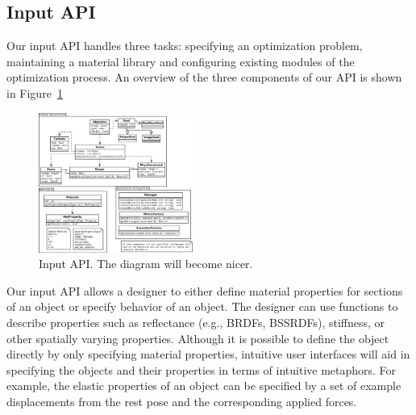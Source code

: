 \documentclass[annual]{acmsiggraph}
\begin{document}
\subsection{Input API}
Our input API handles three tasks: specifying an optimization problem,
maintaining a material library and configuring existing modules of
the optimization process.
An overview of the three components of our API is shown in Figure~\ref{fig:inputAPI}

\begin{figure}
\includegraphics[width=0.45\textwidth]{figure/inputAPI.pdf}
\caption{Input API. The diagram will become nicer.}
\label{fig:inputAPI}
\end{figure}

Our input API allows a designer to either
define material properties for sections of an object
or specify behavior of an object.
The designer
can use functions to describe properties such as reflectance (e.g., BRDFs, BSSRDFs), 
stiffness, or other spatially varying properties. 
Although it is possible to define the object directly by only specifying material
properties, intuitive user
interfaces will aid in specifying the objects and their properties
in terms of intuitive metaphors.
For example, the elastic properties of an object can be specified by a set of
example displacements from the rest pose and the corresponding applied forces.
\end{document}
